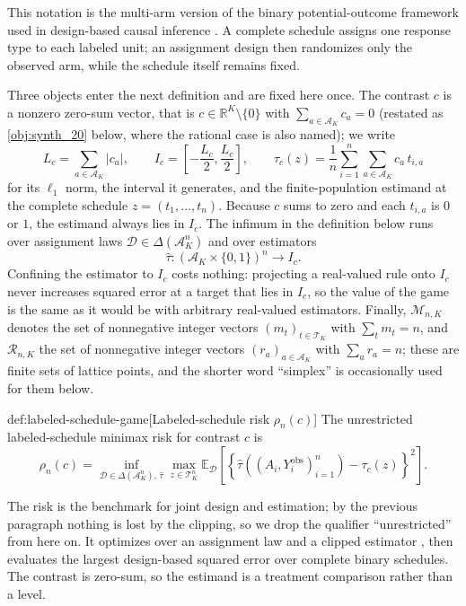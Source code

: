 \documentclass[11pt]{article}
\begin{document}
This notation is the multi-arm version of the binary potential-outcome framework used in design-based causal inference \citep{neyman_1990,rubin_1974,holland_1986,imbens_rubin_2015}. A complete schedule assigns one response type to each labeled unit; an assignment design then randomizes only the observed arm, while the schedule itself remains fixed.

Three objects enter the next definition and are fixed here once. The contrast \(c\) is a nonzero zero-sum vector, that is \(c\in\mathbb R^K\setminus\{0\}\) with \(\sum_{a\in\mathcal A_K}c_a=0\) (restated as \cref{obj:synth_20} below, where the rational case is also named); we write
\[
L_c=\sum_{a\in\mathcal A_K}|c_a|,
\qquad
I_c=\left[-\frac{L_c}{2},\frac{L_c}{2}\right],
\qquad
\tau_c(z)=\frac1n\sum_{i=1}^n\sum_{a\in\mathcal A_K}c_a\,t_{i,a}
\]
for its \(\ell_1\) norm, the interval it generates, and the finite-population estimand at the complete schedule \(z=(t_1,\ldots,t_n)\). Because \(c\) sums to zero and each \(t_{i,a}\) is \(0\) or \(1\), the estimand always lies in \(I_c\). The infimum in the definition below runs over assignment laws \(\mathcal D\in\Delta(\mathcal A_K^n)\) and over estimators
\[
\widehat\tau\colon(\mathcal A_K\times\{0,1\})^n\to I_c .
\]
Confining the estimator to \(I_c\) costs nothing: projecting a real-valued rule onto \(I_c\) never increases squared error at a target that lies in \(I_c\), so the value of the game is the same as it would be with arbitrary real-valued estimators. Finally, \(\mathcal M_{n,K}\) denotes the set of nonnegative integer vectors \((m_t)_{t\in\mathcal T_K}\) with \(\sum_t m_t=n\), and \(\mathcal R_{n,K}\) the set of nonnegative integer vectors \((r_a)_{a\in\mathcal A_K}\) with \(\sum_a r_a=n\); these are finite sets of lattice points, and the shorter word ``simplex'' is occasionally used for them below.

\begin{definitionv}{def:labeled-schedule-game}[Labeled-schedule risk $\rho_n(c)$]
The unrestricted labeled-schedule minimax risk for contrast \(c\) is
\[
\rho_n(c)=\inf_{\mathcal D\in\Delta(\mathcal A_K^n),\,\widehat\tau}\max_{z\in\mathcal T_K^n}\mathbb E_{\mathcal D}\left[\left\{\widehat\tau((A_i,Y_i^{\mathrm{obs}})_{i=1}^n)-\tau_c(z)\right\}^2\right].
\]
\end{definitionv}

The risk  is the benchmark for joint design and estimation; by the previous paragraph nothing is lost by the clipping, so we drop the qualifier ``unrestricted'' from here on. It optimizes over an assignment law  and a clipped estimator , then evaluates the largest design-based squared error over complete binary schedules. The contrast  is zero-sum, so the estimand is a treatment comparison rather than a level.
\end{document}
